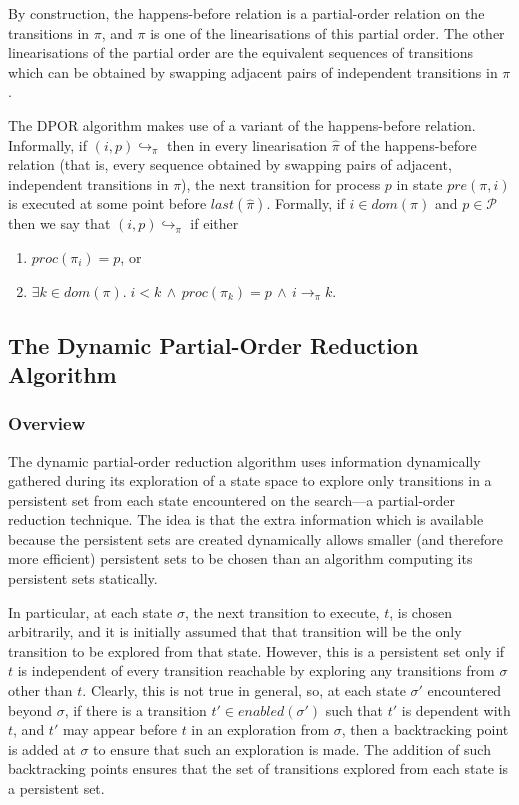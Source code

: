 \documentclass[12pt,a4paper,twoside,openright]{report}
\begin{document}
By construction, the happens-before relation is a
partial-order relation on the transitions in $\pi$,
and $\pi$ is one of the linearisations of this
partial order. The other linearisations of the
partial order are the equivalent sequences of
transitions which can be obtained by swapping
adjacent pairs of independent transitions in $\pi$.

The DPOR algorithm makes use of a variant of the
happens-before relation.
Informally, if $(i, p)\!\hookrightarrow_\pi$ then
in every linearisation $\hat{\pi}$ of the
happens-before relation (that is, every sequence
obtained by swapping pairs of adjacent,
independent transitions in $\pi$), the next
transition for process $p$ in
state $\textit{pre}(\pi, i)$ is executed
at some point before $\textit{last}(\hat{\pi})$.
Formally, 
if $i \in \textit{dom}(\pi)$ and $p \in
\mathcal{P}$ then we
say that $(i, p)\!\hookrightarrow_\pi$ if
either
\begin{enumerate}
	\item $\textit{proc}(\pi_i) = p$, or
	\item $\exists k \in \textit{dom}(\pi).\;
	i < k \,\wedge\, \textit{proc}(\pi_k) = p
	\,\wedge\, i \longrightarrow_\pi k $.
\end{enumerate}


\subsection{The Dynamic Partial-Order Reduction Algorithm}

\subsubsection{Overview}

The dynamic partial-order reduction algorithm
uses information dynamically gathered during its
exploration of a state space to explore only
transitions in a persistent set from each state
encountered on the search---a partial-order
reduction technique. The idea is that the
extra information which is available because
the persistent sets are created dynamically
allows smaller (and therefore more efficient)
persistent sets to be chosen than an algorithm
computing its persistent sets statically.

In particular, at each state $\sigma$, the
next transition
to execute, $t$, is chosen arbitrarily, and it is
initially assumed that that transition will
be the only transition to be explored from
that state. However, this is a persistent
set only if $t$ is
independent of every transition reachable
by exploring any transitions
from $\sigma$ other than $t$. Clearly,
this is not true in general, so, at each
state $\sigma'$ encountered beyond
$\sigma$, if there is a transition
$t' \in \textit{enabled}(\sigma')$
such that $t'$ is dependent with
$t$, and $t'$ may appear before $t$
in an exploration from $\sigma$, then
a backtracking point is added at
$\sigma$ to ensure that such an
exploration is made.
The addition of such backtracking points
ensures that the set of transitions
explored from each state is a
persistent set.
\end{document}

